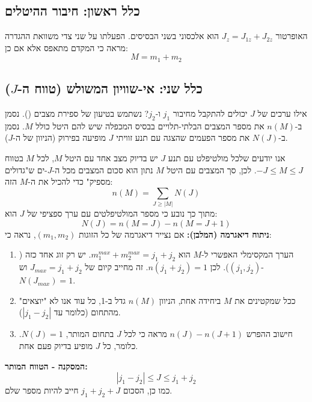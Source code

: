 \subsection{כלל ראשון: חיבור ההיטלים}
האופרטור $J_z = J_{1z} + J_{2z}$ הוא אלכסוני בשני הבסיסים. הפעלתו על שני צדי משוואת ההגדרה מראה כי המקדם מתאפס אלא אם כן:
\[
M = m_1 + m_2
\]

\subsection{כלל שני: אי-שוויון המשולש (טווח ה-$J$)}
אילו ערכים של $J$ יכולים להתקבל מחיבור $j_1$ ו-$j_2$?
נשתמש בטיעון של ספירת מצבים ().
נסמן ב-$n(M)$ את מספר המצבים הבלתי-תלויים בבסיס המכפלה שיש להם היטל כולל $M$.
נסמן ב-$N(J)$ את מספר הפעמים שהצגה עם תנע זוויתי $J$ מופיעה בפירוק (הניוון של ה-$J$).

אנו יודעים שלכל מולטיפלט עם תנע $J$ יש בדיוק מצב אחד עם היטל $M$, לכל $M$ בטווח $-J \le M \le J$.
לכן, סך המצבים עם היטל $M$ נתון הוא סכום המצבים מכל ה-$J$-ים ש"גדולים מספיק" כדי להכיל את ה-$M$ הזה:
\[
n(M) = \sum_{J \ge |M|} N(J)
\]
מתוך כך נובע כי מספר המולטיפלטים עם ערך ספציפי של $J$ הוא:
\[
N(J) = n(M=J) - n(M=J+1)
\]
\textbf{ניתוח דיאגרמה (המלבן):}
אם נצייר דיאגרמה של כל הזוגות $(m_1, m_2)$, נראה כי:
\begin{enumerate}
    \item הערך המקסימלי האפשרי ל-$M$ הוא $m_1^{max} + m_2^{max} = j_1 + j_2$. יש רק זוג אחד כזה ($(j_1, j_2)$). לכן $n(j_1+j_2)=1$. זה מחייב קיום של $J_{max} = j_1+j_2$ וש-$N(J_{max})=1$.
    \item ככל שמקטינים את $M$ ביחידה אחת, הניוון $n(M)$ גדל ב-1, כל עוד אנו לא "יוצאים" מהתחום (כלומר עד $|j_1 - j_2|$).
    \item חישוב ההפרש $n(J) - n(J+1)$ מראה כי לכל $J$ בתחום המותר, $N(J)=1$. כלומר, כל $J$ מופיע בדיוק פעם אחת.
\end{enumerate}

\textbf{המסקנה - הטווח המותר:}
\[
|j_1 - j_2| \le J \le j_1 + j_2
\]
כמו כן, הסכום $j_1 + j_2 + J$ חייב להיות מספר שלם.

